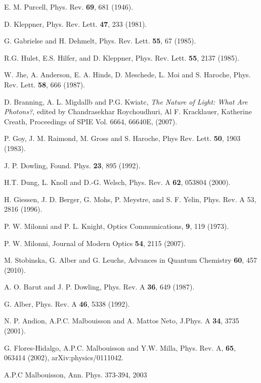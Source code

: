 \documentclass[10pt,english,twocolumn]{revtex4}
\begin{document}
\begin{thebibliography}{99}
 E. M. Purcell, Phys. Rev. {\bf 69}, 681 (1946).

 D. Kleppner, Phys. Rev. Lett. {\bf 47}, 233 (1981).

 G. Gabrielse and H. Dehmelt,  
Phys. Rev. Lett. {\bf 55}, 67 (1985).

 R.G.  Hulet, E.S.  Hilfer, and D. Kleppner,  
Phys. Rev. Lett. {\bf 55}, 2137 (1985).

 W. Jhe, A. Anderson, E. A. Hinds, D. Meschede,
L. Moi and S. Haroche, Phys. Rev. Lett. \textbf{58}, 666 (1987).

 D. Branning, A. L. Migdallb and  P.G. Kwiatc, {\it The Nature of Light: What Are Photons?}, edited by Chandrasekhar Roychoudhuri, Al F. Kracklauer, Katherine Creath, Proceedings of SPIE Vol. 6664, 66640E, (2007).

 P. Goy, J. M. Raimond, M. Gross and S. Haroche,
 Phys Rev. Lett. \textbf{50}, 1903 (1983).

 J. P. Dowling, Found. Phys.  {\bf 23}, 895 (1992).

 H.T. Dung, L. Knoll and  D.-G. Welsch, Phys. Rev. A {\bf 62}, 053804 (2000).

 H. Giessen, J. D. Berger, G. Mohs, P. Meystre, and S. F. Yelin,
Phys. Rev. A 53, 2816 (1996).

 P. W. Milonni and P. L. Knight,
Optics Communications, \textbf{9}, 119 (1973).

 P. W. Milonni,
Journal of Modern Optics \textbf{54}, 2115 (2007).

 M. Stobinska, G. Alber and G. Leuchs, 
Advances in Quantum Chemistry \textbf{60}, 457 (2010).

 A. O. Barut and J. P. Dowling, 
Phys. Rev. A \textbf{36}, 649 (1987).

 G. Alber, 
Phys. Rev. A \textbf{46}, 5338 (1992).

 N. P. Andion, A.P.C. Malbouisson and A. Mattos
Neto, J.Phys. A \textbf{34}, 3735 (2001).

 G. Flores-Hidalgo, A.P.C. Malbouisson and Y.W.
Milla, Phys. Rev. A, \textbf{65}, 063414 (2002), arXiv:physics/0111042.

 A.P.C Malbouisson, Ann. Phys. 373-394, 2003


\end{thebibliography}
\end{document}
